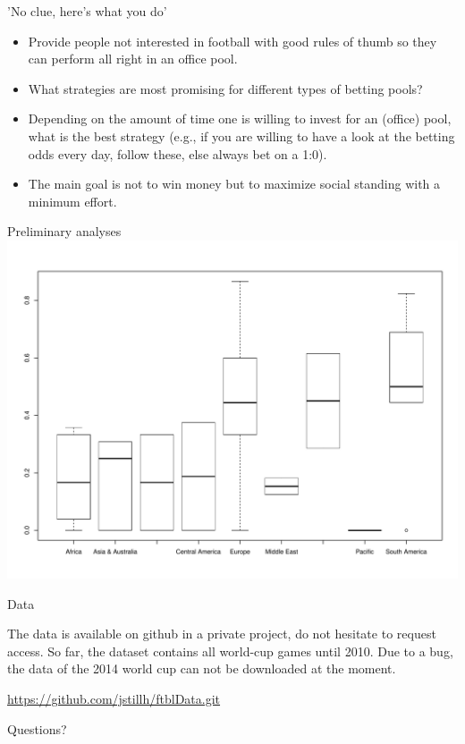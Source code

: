 \documentclass[10pt]{beamer}
\begin{document}
\begin{frame}[fragile]{'No clue, here's what you do'}

\begin{itemize}
\item  Provide people not interested in football with good rules of thumb so they can perform all right in an office pool. 
\item What strategies are most promising for different types of betting pools?
\item Depending on the amount of time one is willing to invest for an (office) pool, what is the best strategy (e.g., if you are willing to have a look at the betting odds every day, follow these, else always bet on a 1:0).
\item The main goal is not to win money but to maximize social standing with a minimum effort. 
\end{itemize}

\end{frame}

\begin{frame}[fragile]{Preliminary analyses}
\includegraphics[scale=0.15]{winpercentage.pdf}
\end{frame}

\begin{frame}[fragile]{Data}

The data is available on github in a private project, do not hesitate to request access.
So far, the dataset contains all world-cup games until 2010. Due to a bug, the data of the 2014 world cup can not be downloaded at the moment.  

\url{https://github.com/jstillh/ftblData.git}
\end{frame}

{
\begin{frame}[standout]
  Questions?
\end{frame}
}


%
%  
%  

\end{document}
